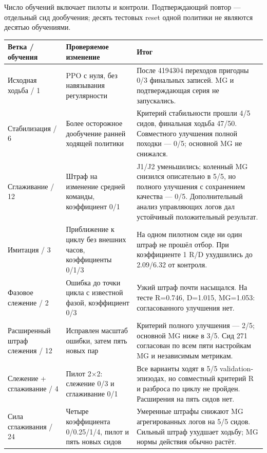 \documentclass[10pt,a4paper]{article}
\begin{document}
Число обучений включает пилоты и контроли. Подтверждающий повтор --- отдельный сид дообучения; десять тестовых reset одной политики не являются десятью обучениями.

\begin{center}\small
\begin{tabularx}{\linewidth}{l>{\raggedright\arraybackslash}X>{\raggedright\arraybackslash}X}
\toprule
Ветка / обучения & Проверяемое изменение & Итог \\
\midrule
Исходная ходьба / 1 & PPO с нуля, без навязывания регулярности & После 4194304 переходов пригодны 0/3 финальных записей. MG и подтверждающая серия не запускались. \\
Стабилизация / 6 & Более осторожное дообучение ранней ходящей политики & Критерий стабильности прошли 4/5 сидов, финальная ходьба 47/50. Совместного улучшения полной походки --- 0/5; основной MG не снижался. \\
Сглаживание / 12 & Штраф на изменение средней команды, коэффициент 0/1 & J1/J2 уменьшились; коленный MG снизился описательно в 5/5, но полного улучшения с сохранением качества --- 0/5. Дополнительный анализ управляющих логов дал устойчивый положительный результат. \\
Имитация / 3 & Приближение к циклу без внешних часов, коэффициенты 0/1/3 & На одном пилотном сиде ни один штраф не прошёл отбор. При коэффициенте 1 R/D ухудшились до 2.09/6.32 от контроля. \\
Фазовое слежение / 2 & Ошибка до точки цикла с известной фазой, коэффициент 0/3 & Узкий штраф почти насыщался. На тесте R=0.746, D=1.015, MG=1.053: согласованного улучшения нет. \\
Расширенный штраф слежения / 12 & Исправлен масштаб ошибки, затем пять новых пар & Критерий полного улучшения --- 2/5; основной MG ниже в 3/5. Сид 271 согласован по всем пяти настройкам MG и независимым метрикам. \\
Слежение + сглаживание / 4 & Пилот 2\ensuremath{\times}2: слежение 0/3 и сглаживание 0/1 & Все варианты ходят в 5/5 validation-эпизодах, но совместный критерий R и разброса по циклу не пройден. Расширения на пять сидов нет. \\
Сила сглаживания / 24 & Четыре коэффициента 0/0.25/1/4, пилот и пять новых сидов & Умеренные штрафы снижают MG агрегированных логов на 5/5 сидов. Сильный штраф ухудшает ходьбу; MG нормы действия обычно растёт. \\
\bottomrule\end{tabularx}\end{center}
\end{document}
